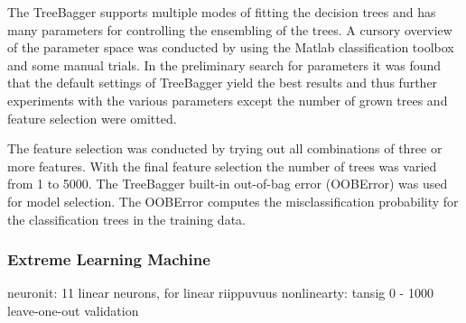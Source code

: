 The TreeBagger supports multiple modes of fitting the decision trees and has many parameters for controlling the ensembling of the trees. A cursory overview of the parameter space was conducted by using the Matlab classification toolbox and some manual trials. In the preliminary search for parameters it was found that the default settings of TreeBagger yield the best results and thus further experiments with the various parameters except the number of grown trees and feature selection were omitted.

The feature selection was conducted by trying out all combinations of three or more features. With the final feature selection the number of trees was varied from 1 to 5000. The TreeBagger built-in out-of-bag error (OOBError) was used for model selection. The OOBError computes the misclassification probability for the classification trees in the training data.

\subsubsection{Extreme Learning Machine}
neuronit: 11 linear neurons, for linear riippuvuus
nonlinearty: tansig 0 - 1000
leave-one-out validation




